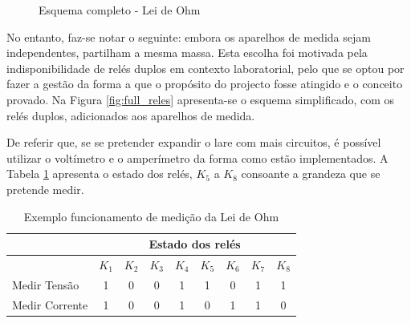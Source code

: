 \begin{figure}[hbtp]
	\centering%
		\centering
		\qquad
		\caption{Esquema completo - Lei de Ohm}%
		\label{fig:}%
	\end{figure}

No entanto, faz-se notar o seguinte: embora os aparelhos de medida sejam independentes, partilham a mesma massa. Esta escolha foi motivada pela indisponibilidade de relés duplos em contexto laboratorial, pelo que se optou por fazer a gestão da forma a que o propósito do projecto fosse atingido e o conceito provado. Na Figura \ref{fig:full_reles} apresenta-se o esquema simplificado, com os relés duplos, adicionados aos aparelhos de medida. 

De referir que, se se pretender expandir o \acrshort{lare} com mais circuitos, é possível utilizar o voltímetro e o amperímetro da forma como estão implementados. A Tabela \ref{Table:exemplomedicaoohm} apresenta o estado dos relés, $K_{5}$ a $K_{8}$ consoante a grandeza que se pretende medir.

\begin{table}[htb]
	\centering
	\caption{Exemplo funcionamento de medição da Lei de Ohm} 
	
	\label{Table:exemplomedicaoohm}
	\begin{tabular}{lcccccccc}
		\toprule
		               & \multicolumn{8}{c}{Estado dos relés}                                                                       \\
		\midrule
		               & $K_{1}$                              & $K_{2}$ & $K_{3}$ & $K_{4}$ & $K_{5}$ & $K_{6}$ & $K_{7}$ & $K_{8}$ \\
		\midrule
		Medir Tensão   & 1                                    & 0       & 0       & 1       & 1       & 0       & 1       & 1       \\
		\midrule
		Medir Corrente & 1                                    & 0       & 0       & 1       & 0       & 1       & 1       & 0       \\
		\bottomrule
	\end{tabular}
\end{table}

